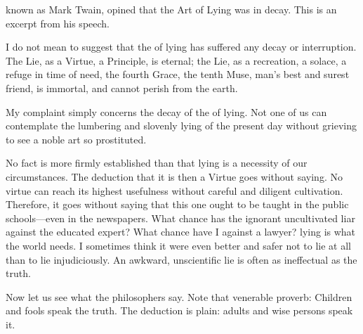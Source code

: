 \documentclass{novelette}
\begin{document}
\begin{display}
\vfil
{\centering{}\par}
\vfil
\end{display}

\blankpage

\mainmatter

\begin{opening}
\null\null\null\null\null\null
{}
\null\null\null\null\null\null\null\null
\end{opening}
 known as Mark Twain, opined that the Art of Lying
was in decay. This is an excerpt from his speech.

\scene{-}

I do not mean to suggest that the  of lying has
suffered any decay or interruption. The Lie, as a Virtue, a
Principle, is eternal; the Lie, as a recreation, a solace, a refuge in
time of need, the fourth Grace, the tenth Muse, man's best and surest
friend, is immortal, and cannot perish from the earth.

My complaint simply concerns the decay of the  of lying.
Not one of us can contemplate the lumbering and slovenly lying of the
present day without grieving to see a noble art so prostituted.

No fact is more firmly established than that lying is a necessity of our
circumstances. The deduction that it is then a Virtue goes without
saying. No virtue can reach its highest usefulness without careful and
diligent cultivation. Therefore, it goes without saying that this one
ought to be taught in the public schools---even in the newspapers. What
chance has the ignorant uncultivated liar against the educated expert?
What chance have I against a lawyer?  lying
is what the world needs. I sometimes think it were even better and safer
not to lie at all than to lie injudiciously. An awkward, unscientific
lie is often as ineffectual as the truth.

Now let us see what the philosophers say. Note that venerable proverb:
Children and fools  speak the truth. The deduction is plain:
adults and wise persons  speak it.

\end{document}
